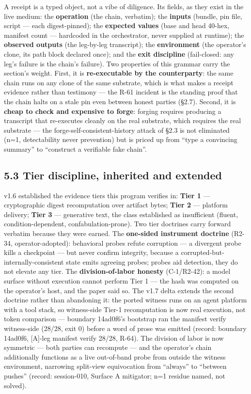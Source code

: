 \documentclass[11pt]{article}
\begin{document}
A receipt is a typed object, not a vibe of diligence. Its fields, as they exist in the live medium: the \textbf{operation} (the chain, verbatim); the \textbf{inputs} (bundle, pin file, script --- each digest-pinned); the \textbf{expected values} (base and head 40-hex, manifest count --- hardcoded in the orchestrator, never supplied at runtime); the \textbf{observed outputs} (the leg-by-leg transcript); the \textbf{environment} (the operator's clone, its path block declared once); and the \textbf{exit discipline} (fail-closed: any leg's failure is the chain's failure). Two properties of this grammar carry the section's weight. First, it is \textbf{re-executable by the counterparty}: the same chain runs on any clone of the same substrate, which is what makes a receipt evidence rather than testimony --- the R-61 incident is the standing proof that the chain halts on a stale pin even between honest parties (\S{}2.7). Second, it is \textbf{cheap to check and expensive to forge}: forging requires producing a transcript that re-executes cleanly on the real substrate, which requires the real substrate --- the forge-self-consistent-history attack of \S{}2.3 is not eliminated (n=1, detectability never prevention) but is priced up from ``type a convincing summary'' to ``construct a verifiable fake chain''.

\subsection{5.3 Tier discipline, inherited and extended}\label{tier-discipline-inherited-and-extended}

v1.6 established the evidence tiers this program verifies in: \textbf{Tier 1} --- cryptographic digest recomputation over artifact bytes; \textbf{Tier 2} --- platform delivery; \textbf{Tier 3} --- generative text, the class established as insufficient (fluent, condition-dependent, confabulation-prone). Two tier doctrines carry forward verbatim because they were earned. The \textbf{one-sided instrument doctrine} (R2-34, operator-adopted): behavioral probes refute corruption --- a divergent probe kills a checkpoint --- but never confirm integrity, because a corrupted-but-internally-consistent state emits agreeing probes; probes aid detection, they do not elevate any tier. The \textbf{division-of-labor honesty} (C-1/R2-42): a model surface without execution cannot perform Tier 1 --- the hash was computed on the operator's host, and the paper said so. The v1.7 delta extends the second doctrine rather than abandoning it: the ported witness runs on an agent platform with a tool stack, so witness-side Tier-1 recomputation is now real execution, not token comparison --- boundary 14ad0f6's bootstrap ran the manifest verify witness-side (28/28, exit 0) before a word of prose was emitted (record: boundary 14ad0f6, {[}A{]}-leg manifest verify 28/28, R-64). The division of labor is now symmetric --- both parties can recompute --- and the operator's chain additionally functions as a live out-of-band probe from outside the witness environment, narrowing split-view equivocation from ``always'' to ``between pushes'' (record: session-010, Surface A mitigator; n=1 residue named, not solved).
\end{document}

